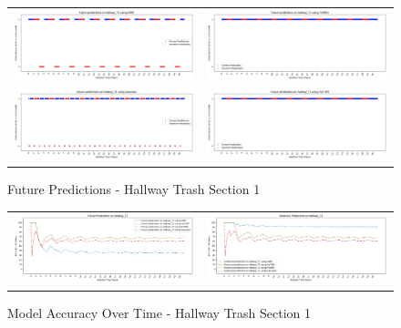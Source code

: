 \begin{figure}
  \begin{tabular}{cc}
    {\includegraphics[width = 3in]{images/results/Future_hallway_T1_DMM.png}} &
    {\includegraphics[width = 3in]{images/results/Future_hallway_T1_FreMEn.png}} \\
    {\includegraphics[width = 3in]{images/results/Future_hallway_T1_Gaussian.png}} &
    {\includegraphics[width = 3in]{images/results/Future_hallway_T1_HyT-EM.png}} \\
  \end{tabular}
  \caption{Future Predictions - Hallway Trash Section 1}
\end{figure}

\begin{figure}
  \begin{tabular}{cc}
    {\includegraphics[width = 3in]{images/results/Future_Predictions_on_hallway_T1.png}} &
    {\includegraphics[width = 3in]{images/results/Historical_Predictions_on_hallway_T1.png}} \\
  \end{tabular}
  \caption{Model Accuracy Over Time - Hallway Trash Section 1}
\end{figure}




